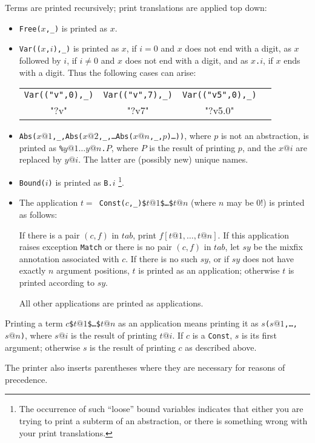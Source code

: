 Terms are printed recursively; print translations are applied top down:
\begin{itemize}
\item {\tt Free($x$,_)} is printed as $x$.
\item {\tt Var(($x$,$i$),_)} is printed as $x$, if $i = 0$ and $x$ does not
  end with a digit, as $x$ followed by $i$, if $i \neq 0$ and $x$ does not
  end with a digit, and as {\tt $x$.$i$}, if $x$ ends with a digit.  Thus the
  following cases can arise:
\begin{center}
{\tt\begin{tabular}{cccc}
\verb$Var(("v",0),_)$ & \verb$Var(("v",7),_)$ & \verb$Var(("v5",0),_)$ \\
"?v" & "?v7" & "?v5.0"
\end{tabular}}
\end{center}
\item {\tt Abs($x@1$,_,Abs($x@2$,_,\dots Abs($x@n$,_,$p$)\dots))}, where $p$
  is not an abstraction, is printed as {\tt \%$y@1\dots y@n$.$P$}, where $P$
  is the result of printing $p$, and the $x@i$ are replaced by $y@i$.  The
  latter are (possibly new) unique names.
\item {\tt Bound($i$)} is printed as {\tt B.$i$} \footnote{The occurrence of
    such ``loose'' bound variables indicates that either you are trying to
    print a subterm of an abstraction, or there is something wrong with your
    print translations.}.
\item The application {\tt$t =$ Const($c$,_)\$$t@1$\$\dots\$$t@n$} (where
  $n$ may be $0$!) is printed as follows:

  If there is a pair $(c,f)$ in $tab$, print $f[t@1,\dots,t@n]$.  If this
  application raises exception {\tt Match} or there is no pair $(c,f)$ in
  $tab$, let $sy$ be the mixfix annotation associated with $c$.  If there is
  no such $sy$, or if $sy$ does not have exactly $n$ argument positions, $t$
  is printed as an application; otherwise $t$ is printed according to $sy$.

  All other applications are printed as applications.
\end{itemize}
Printing a term {\tt $c$\$$t@1$\$\dots\$$t@n$} as an application means
printing it as {\tt $s$($s@1$,\dots,$s@n$)}, where $s@i$ is the result of
printing $t@i$.  If $c$ is a {\tt Const}, $s$ is its first argument;
otherwise $s$ is the result of printing $c$ as described above.
\medskip

The printer also inserts parentheses where they are necessary for reasons
of precedence.

